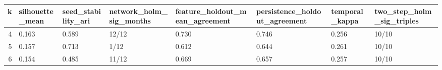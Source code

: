 \begin{tabular}{rlllllll}
\toprule
 k & silhouette\_mean & seed\_stability\_ari & network\_holm\_sig\_months & feature\_holdout\_mean\_agreement & persistence\_holdout\_agreement & temporal\_kappa & two\_step\_holm\_sig\_triples \\
\midrule
 4 &           0.163 &              0.589 &                   12/12 &                          0.730 &                         0.746 &          0.256 &                     10/10 \\
 5 &           0.157 &              0.713 &                    1/12 &                          0.612 &                         0.644 &          0.261 &                     10/10 \\
 6 &           0.154 &              0.485 &                   11/12 &                          0.669 &                         0.657 &          0.257 &                     10/10 \\
\bottomrule
\end{tabular}
